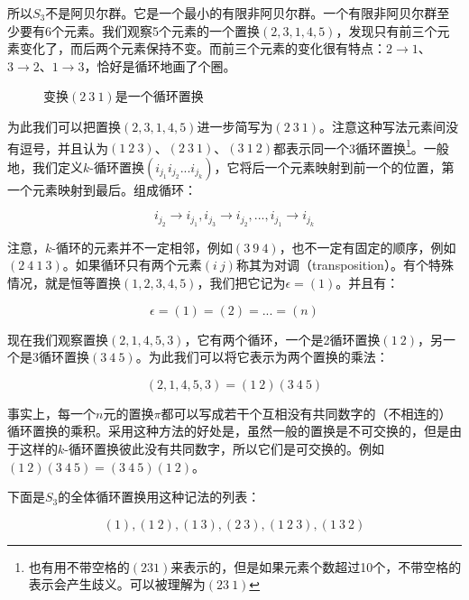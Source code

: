 \documentclass{article}
\begin{document}
所以$S_3$不是阿贝尔群。它是一个最小的有限非阿贝尔群。一个有限非阿贝尔群至少要有6个元素。我们观察5个元素的一个置换$(2, 3, 1, 4, 5)$，发现只有前三个元素变化了，而后两个元素保持不变。而前三个元素的变化很有特点：$2 \to 1$、$3 \to 2$、$1 \to 3$，恰好是循环地画了个圈。

\begin{figure}[htbp]
\centering
{}
\caption{变换$(2\ 3\ 1)$是一个循环置换}
\label{fig:cycle-permutation}
\end{figure}

为此我们可以把置换$(2, 3, 1, 4, 5)$进一步简写为$(2\ 3\ 1)$。注意这种写法元素间没有逗号，并且认为$(1\ 2\ 3)$、$(2\ 3\ 1)$、$(3\ 1\ 2)$都表示同一个3循环置换\footnote{也有用不带空格的$(231)$来表示的，但是如果元素个数超过10个，不带空格的表示会产生歧义。可以被理解为$(23\ 1)$}。一般地，我们定义$k$-循环置换$(i_{j_1} i_{j_2} ... i_{j_k})$，它将后一个元素映射到前一个的位置，第一个元素映射到最后。组成循环：

\[
i_{j_2} \to i_{j_1}, i_{j_3} \to i_{j_2}, ..., i_{j_1} \to i_{j_k}
\]

注意，$k$-循环的元素并不一定相邻，例如$(3\ 9\ 4)$，也不一定有固定的顺序，例如$(2\ 4\ 1\ 3)$。如果循环只有两个元素$(i\ j)$称其为对调（transposition）。有个特殊情况，就是恒等置换$(1, 2, 3, 4, 5)$，我们把它记为$\epsilon = (1)$。并且有：

\[
\epsilon = (1) = (2) = ... = (n)
\]

现在我们观察置换$(2, 1, 4, 5, 3)$，它有两个循环，一个是2循环置换$(1\ 2)$，另一个是3循环置换$(3\ 4\ 5)$。为此我们可以将它表示为两个置换的乘法：

\[
(2, 1, 4, 5, 3) = (1\ 2)(3\ 4\ 5)
\]

事实上，每一个$n$元的置换$\pi$都可以写成若干个互相没有共同数字的（不相连的）循环置换的乘积。采用这种方法的好处是，虽然一般的置换是不可交换的，但是由于这样的$k$-循环置换彼此没有共同数字，所以它们是可交换的。例如$(1\ 2)(3\ 4\ 5) = (3\ 4\ 5)(1\ 2)$。

下面是$S_3$的全体循环置换用这种记法的列表：

\[
(1),
(1\ 2), (1\ 3), (2\ 3),
(1\ 2\ 3), (1\ 3\ 2)
\]
\end{document}
